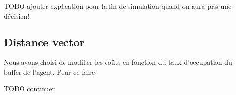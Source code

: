 \documentclass[a4paper,11pt]{article}
\begin{document}
TODO ajouter explication pour la fin de simulation quand on aura pris une décision!


\subsection{Distance vector}
Nous avons choisi de modifier les coûts en fonction du taux d'occupation du buffer de l'agent. Pour ce faire

TODO continuer


\clearpage


\appendix
\end{document}
